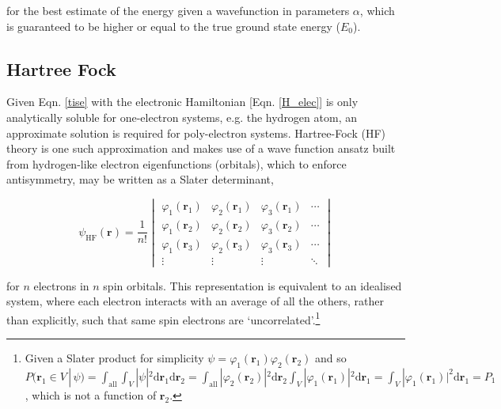 \documentclass[main.tex]{subfiles}
\begin{document}
 for the best estimate of the energy given a wavefunction in parameters $\alpha$, which is guaranteed to be higher or equal to the true ground state energy ($E_0$).

\subsection{Hartree Fock}

Given Eqn. \eqref{tise} with the electronic Hamiltonian [Eqn. \eqref{H_elec}] is only analytically soluble for one-electron systems, e.g. the hydrogen atom, an approximate solution is required for poly-electron systems. Hartree-Fock (HF) theory is one such approximation and makes use of a wave function ansatz built from hydrogen-like electron eigenfunctions (orbitals), which to enforce antisymmetry, may be written as a Slater determinant,

\begin{equation}
\psi_\text{HF}(\boldsymbol{r}) = \frac{1}{n!}
\begin{vmatrix}
\varphi_1(\boldsymbol{r}_1) & \varphi_2(\boldsymbol{r}_1) & \varphi_3(\boldsymbol{r}_1) & \cdots \\
\varphi_1(\boldsymbol{r}_2) & \varphi_2(\boldsymbol{r}_2) & \varphi_3(\boldsymbol{r}_2) & \cdots \\
\varphi_1(\boldsymbol{r}_3) & \varphi_2(\boldsymbol{r}_3) & \varphi_3(\boldsymbol{r}_3) & \cdots \\
\vdots & \vdots & \vdots & \ddots
\end{vmatrix}
\label{equation::slater_det}
\end{equation}

for $n$ electrons in $n$ spin orbitals. This representation is equivalent to an idealised system, where each electron interacts with an average of all the others, rather than explicitly, such that same spin electrons are `uncorrelated'.\footnote{Given a Slater product for simplicity $\psi = \varphi_1(\boldsymbol{r}_1)\varphi_2(\boldsymbol{r}_2)$ and so $P(\boldsymbol{r}_1 \in V \,|\, \psi) =  \int_\text{all}\int_V |\psi|^2 \text{d}\boldsymbol{r}_1\text{d}\boldsymbol{r}_2 = \int_\text{all}|\varphi_2(\boldsymbol{r}_2)|^2\text{d}\boldsymbol{r}_2\int_V |\varphi_1(\boldsymbol{r}_1)|^2\text{d}\boldsymbol{r}_1 = \int_V |\varphi_1(\boldsymbol{r}_1)|^2\text{d}\boldsymbol{r}_1 = P_1$, which is not a function of $\boldsymbol{r}_2$.}
\end{document}
